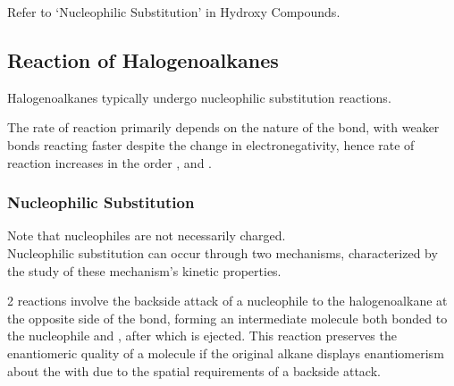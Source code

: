 \documentclass[../main]{subfiles}
\begin{document}
	Refer to `Nucleophilic Substitution' in Hydroxy Compounds. \\

	\subsection{Reaction of Halogenoalkanes}

	Halogenoalkanes typically undergo nucleophilic substitution reactions.

	The rate of reaction primarily depends on the nature of the  bond, with weaker bonds reacting faster despite the change in electronegativity, hence rate of reaction increases in the order , and . \\

	\subsubsection{Nucleophilic Substitution}


	Note that nucleophiles are not necessarily charged. \\

	Nucleophilic substitution can occur through two mechanisms, characterized by the study of these mechanism's kinetic properties.


	2 reactions involve the backside attack of a nucleophile to the halogenoalkane at the opposite side of the  bond, forming an intermediate molecule both bonded to the nucleophile and , after which  is ejected. This reaction preserves the enantiomeric quality of a molecule if the original alkane displays enantiomerism about the  with  due to the spatial requirements of a backside attack. 

\end{document}

